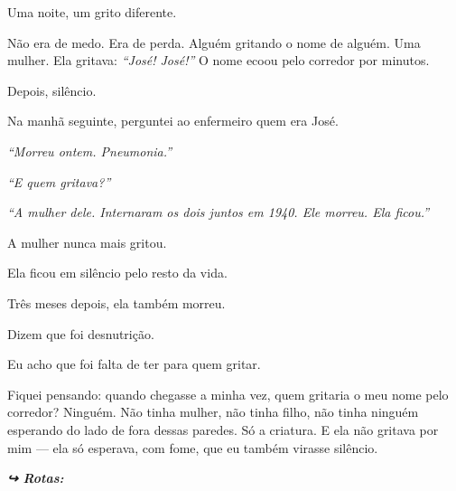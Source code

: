 \noindent Uma noite, um grito diferente.

\noindent Não era de medo. Era de perda. Alguém gritando o nome de alguém. Uma mulher. Ela gritava: \textit{\textquotedblleft{}José! José!\textquotedblright{}} O nome ecoou pelo corredor por minutos.

\noindent Depois, silêncio.

\noindent Na manhã seguinte, perguntei ao enfermeiro quem era José.

\noindent \textit{\textquotedblleft{}Morreu ontem. Pneumonia.\textquotedblright{}}

\noindent \textit{\textquotedblleft{}E quem gritava?\textquotedblright{}}

\noindent \textit{\textquotedblleft{}A mulher dele. Internaram os dois juntos em 1940. Ele morreu. Ela ficou.\textquotedblright{}}

\noindent A mulher nunca mais gritou.

\noindent Ela ficou em silêncio pelo resto da vida.

\noindent Três meses depois, ela também morreu.

\noindent Dizem que foi desnutrição.

\noindent Eu acho que foi falta de ter para quem gritar.

\noindent Fiquei pensando: quando chegasse a minha vez, quem gritaria o meu nome pelo corredor? Ninguém. Não tinha mulher, não tinha filho, não tinha ninguém esperando do lado de fora dessas paredes. Só a criatura. E ela não gritava por mim --- ela só esperava, com fome, que eu também virasse silêncio.

\vspace{0.5em}
\noindent\textit{\textbf{↪ Rotas:}  \rotasep {}}